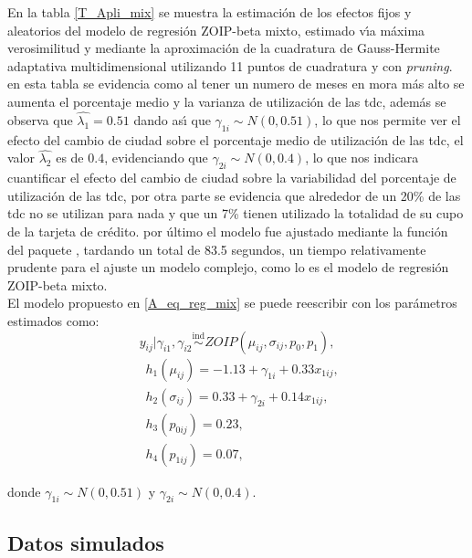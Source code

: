 En la tabla \ref{T_Apli_mix} se muestra la estimaci\'{o}n de los efectos fijos y aleatorios del modelo de regresi\'{o}n ZOIP-beta mixto, estimado v\'{\i}a m\'{a}xima verosimilitud y mediante la aproximaci\'{o}n de la cuadratura de Gauss-Hermite adaptativa multidimensional utilizando 11 puntos de cuadratura y con \textit{pruning}. en esta tabla se evidencia como al tener un numero de meses en mora m\'{a}s alto se aumenta el porcentaje medio y la varianza de utilizaci\'{o}n de las tdc, adem\'{a}s se observa que $\hat{\lambda_1}=0.51$ dando as\'{\i} que $\gamma_{1i} \sim N(0, 0.51)$, lo que nos permite ver el efecto del cambio de ciudad sobre el porcentaje medio de utilizaci\'{o}n de las tdc, el valor $\hat{\lambda_2}$ es de $0.4$, evidenciando que $\gamma_{2i} \sim N(0, 0.4)$, lo que nos indicara cuantificar el efecto del cambio de ciudad sobre la variabilidad del porcentaje de utilizaci\'{o}n de las tdc, por otra parte se evidencia que alrededor de un 20\% de las tdc no se utilizan para nada y que un 7\% tienen utilizado la totalidad de su cupo de la tarjeta de cr\'{e}dito. por \'{u}ltimo el modelo fue ajustado mediante la funci\'{o}n  del paquete , tardando un total de 83.5 segundos, un tiempo relativamente prudente para el ajuste un modelo complejo, como lo es el modelo de regresi\'{o}n ZOIP-beta mixto.\\

El modelo propuesto en \eqref{A_eq_reg_mix} se puede reescribir con los par\'{a}metros estimados como:
\[
y_{ij}| \gamma_{i1},\gamma_{i2} \overset{\text{ind}}{\sim} ZOIP(\mu_{ij},\sigma_{ij},p_0, p_1),
\]
\begin{equation}
\begin{split}
&h_1(\mu_{ij})=-1.13+\gamma_{1i}+0.33 x_{1ij},\\
&h_2(\sigma_{ij})=0.33+\gamma_{2i}+0.14 x_{1ij},\\
&h_3(p_{0ij})=0.23,\\
&h_4(p_{1ij}) =0.07,
\end{split}
\label{A_eq_reg_mix2}
\end{equation}

donde $\gamma_{1i} \sim N(0, 0.51)$ y $\gamma_{2i} \sim N(0, 0.4)$.

\subsection{Datos simulados}

